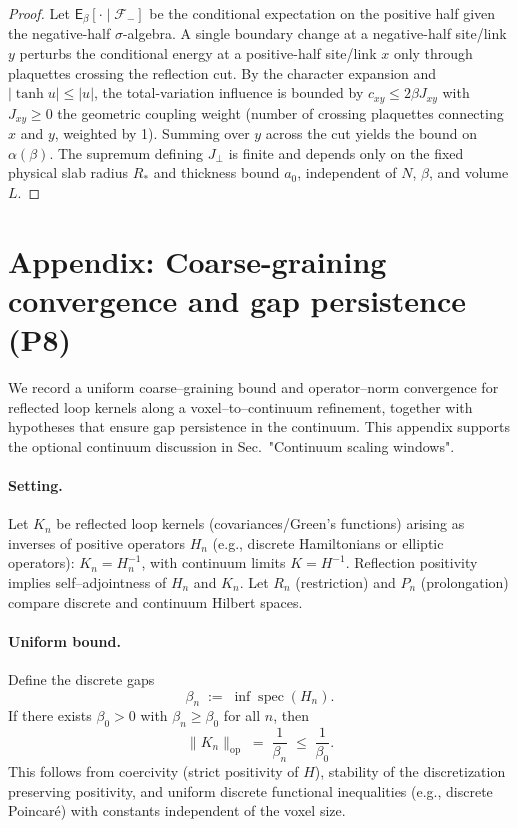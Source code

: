 \documentclass[11pt]{amsart}
\theoremstyle{plain}
\theoremstyle{definition}
\theoremstyle{remark}
\begin{document}
\begin{proof}
Let $\mathsf{E}_\beta[\cdot \mid \mathcal{F}_{-}]$ be the conditional expectation on the positive half given the negative-half $\sigma$-algebra. A single boundary change at a negative-half site/link $y$ perturbs the conditional energy at a positive-half site/link $x$ only through plaquettes crossing the reflection cut. By the character expansion and $|\tanh u| \le |u|$, the total-variation influence is bounded by $c_{xy} \le 2\beta J_{xy}$ with $J_{xy} \ge 0$ the geometric coupling weight (number of crossing plaquettes connecting $x$ and $y$, weighted by 1). Summing over $y$ across the cut yields the bound on $\alpha(\beta)$. The supremum defining $J_{\perp}$ is finite and depends only on the fixed physical slab radius $R_*$ and thickness bound $a_0$, independent of $N$, $\beta$, and volume $L$.
\end{proof}
\section{Appendix: Coarse-graining convergence and gap persistence (P8)}
We record a uniform coarse--graining bound and operator--norm convergence for reflected loop kernels along a voxel--to--continuum refinement, together with hypotheses that ensure gap persistence in the continuum. This appendix supports the optional continuum discussion in Sec.~"Continuum scaling windows".

\paragraph{Setting.}
Let $K_n$ be reflected loop kernels (covariances/Green's functions) arising as inverses of positive operators $H_n$ (e.g., discrete Hamiltonians or elliptic operators): $K_n=H_n^{-1}$, with continuum limits $K=H^{-1}$. Reflection positivity implies self--adjointness of $H_n$ and $K_n$. Let $R_n$ (restriction) and $P_n$ (prolongation) compare discrete and continuum Hilbert spaces.

\paragraph{Uniform bound.}
Define the discrete gaps
\[
  \beta_n\;:=\;\inf \operatorname{spec}(H_n).
\]
If there exists $\beta_0>0$ with $\beta_n\ge \beta_0$ for all $n$, then
\[
  \lVert K_n\rVert_{\mathrm{op}}\;=\;\frac{1}{\beta_n}\;\le\;\frac{1}{\beta_0}.
\]
This follows from coercivity (strict positivity of $H$), stability of the discretization preserving positivity, and uniform discrete functional inequalities (e.g., discrete Poincar\'e) with constants independent of the voxel size.
\end{document}
